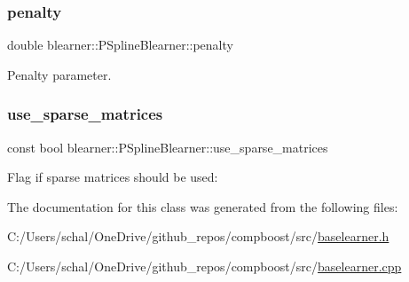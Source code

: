 \subsubsection{\texorpdfstring{penalty}{penalty}}
{\footnotesize\ttfamily double blearner\+::\+P\+Spline\+Blearner\+::penalty\hspace{0.3cm}{\ttfamily [private]}}



Penalty parameter. 

\mbox{\label{classblearner_1_1_p_spline_blearner_ab5b07123065e500bcaf02c33b7ebb64f}} 
\subsubsection{\texorpdfstring{use\+\_\+sparse\+\_\+matrices}{use\_sparse\_matrices}}
{\footnotesize\ttfamily const bool blearner\+::\+P\+Spline\+Blearner\+::use\+\_\+sparse\+\_\+matrices\hspace{0.3cm}{\ttfamily [private]}}



Flag if sparse matrices should be used\+: 



The documentation for this class was generated from the following files\+:\begin{DoxyCompactItemize}
\item 
C\+:/\+Users/schal/\+One\+Drive/github\+\_\+repos/compboost/src/\mbox{\hyperlink{baselearner_8h}{baselearner.\+h}}\item 
C\+:/\+Users/schal/\+One\+Drive/github\+\_\+repos/compboost/src/\mbox{\hyperlink{baselearner_8cpp}{baselearner.\+cpp}}\end{DoxyCompactItemize}
